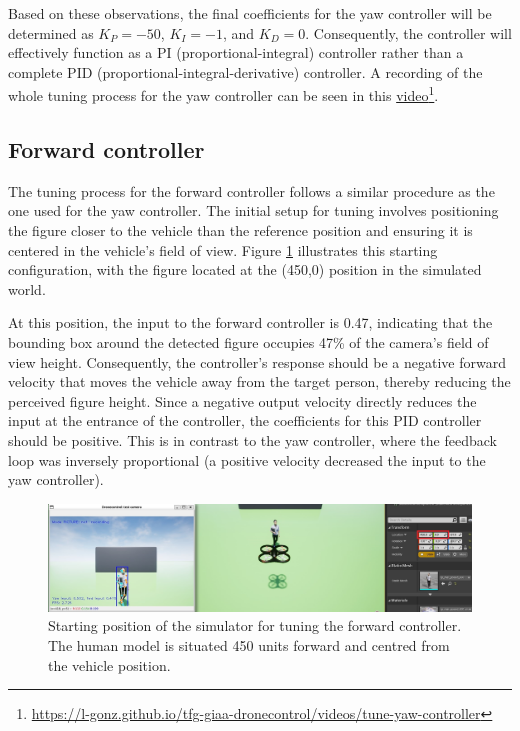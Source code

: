 Based on these observations, the final coefficients for the yaw controller will be determined as $K_P=-50$, $K_I=-1$, and $K_D=0$. Consequently, the controller will effectively function as a PI (proportional-integral) controller rather than a complete PID (proportional-integral-derivative) controller. A recording of the whole tuning process for the yaw controller can be seen in this \href{https://l-gonz.github.io/tfg-giaa-dronecontrol/videos/tune-yaw-controller}{video}\footnote{\url{https://l-gonz.github.io/tfg-giaa-dronecontrol/videos/tune-yaw-controller}}.


\subsection{Forward controller}

The tuning process for the forward controller follows a similar procedure as the one used for the yaw controller. The initial setup for tuning involves positioning the figure closer to the vehicle than the reference position and ensuring it is centered in the vehicle's field of view. Figure \ref{fig:tune-ref-pos-fwd} illustrates this starting configuration, with the figure located at the (450,0) position in the simulated world. 

At this position, the input to the forward controller is 0.47, indicating that the bounding box around the detected figure occupies 47\% of the camera's field of view height. Consequently, the controller's response should be a negative forward velocity that moves the vehicle away from the target person, thereby reducing the perceived figure height. Since a negative output velocity directly reduces the input at the entrance of the controller, the coefficients for this PID controller should be positive. This is in contrast to the yaw controller, where the feedback loop was inversely proportional (a positive velocity decreased the input to the yaw controller).


\begin{figure}
  \centering
  \includegraphics[width=\textwidth, keepaspectratio]{img/pid/tune-ref-pos-fwd.jpg}
  \caption{Starting position of the simulator for tuning the forward controller. The human model is situated 450 units forward and centred from the vehicle position.}\label{fig:tune-ref-pos-fwd}
\end{figure}


